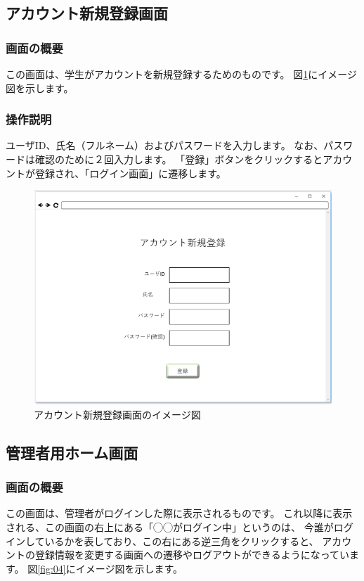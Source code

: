 \subsection{アカウント新規登録画面\label{creat_account}}
\subsubsection{画面の概要}
この画面は、学生がアカウントを新規登録するためのものです。
図\ref{fig:03}にイメージ図を示します。

\subsubsection{操作説明}
ユーザID、氏名（フルネーム）およびパスワードを入力します。
なお、パスワードは確認のために２回入力します。
「登録」ボタンをクリックするとアカウントが登録され、「ログイン画面」に遷移します。

\begin{figure}[htbp]
  \begin{center}
    \includegraphics[width=0.7\linewidth,clip]{./img/03.png}
    \caption{アカウント新規登録画面のイメージ図}\label{fig:03}
  \end{center}
\end{figure}

\newpage

\subsection{管理者用ホーム画面}
\subsubsection{画面の概要}
この画面は、管理者がログインした際に表示されるものです。
これ以降に表示される、この画面の右上にある「◯◯がログイン中」というのは、
今誰がログインしているかを表しており、この右にある逆三角をクリックすると、
アカウントの登録情報を変更する画面への遷移やログアウトができるようになっています。
図\ref{fig:04}にイメージ図を示します。

